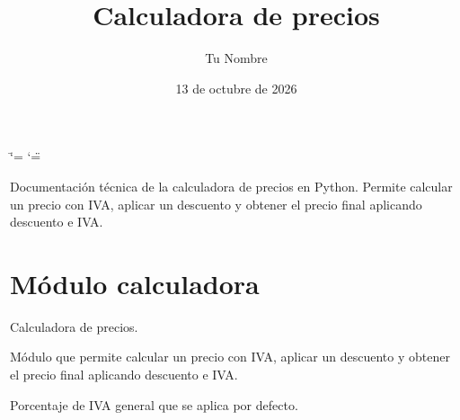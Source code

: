 \documentclass[letterpaper,10pt,spanish]{sphinxmanual}
\title{Calculadora de precios}
\date{13 de octubre de 2026}
\author{Tu Nombre}
\begin{document}
\ifdefined\shorthandoff
  \ifnum\catcode`\=\string=\active\shorthandoff{=}\fi
  \ifnum\catcode`\"=\active{}\fi
\fi

\pagestyle{empty}
\sphinxmaketitle
\pagestyle{plain}
\sphinxtableofcontents
\pagestyle{normal}
\label{\detokenize{index::doc}}


\sphinxAtStartPar
Documentación técnica de la calculadora de precios en Python. Permite
calcular un precio con IVA, aplicar un descuento y obtener el precio final
aplicando descuento e IVA.

\sphinxstepscope


\chapter{Módulo calculadora}
\label{\detokenize{calculadora:module-calculadora}}\label{\detokenize{calculadora:modulo-calculadora}}\label{\detokenize{calculadora::doc}}
\sphinxAtStartPar
Calculadora de precios.

\sphinxAtStartPar
Módulo que permite calcular un precio con IVA, aplicar un descuento y
obtener el precio final aplicando descuento e IVA.

\begin{fulllineitems}
\label{\detokenize{calculadora:calculadora.IVA_GENERAL}}
\pysigstartsignatures
\pysigline
{}
\pysigstopsignatures
\sphinxAtStartPar
Porcentaje de IVA general que se aplica por defecto.

\end{fulllineitems}

\end{document}
